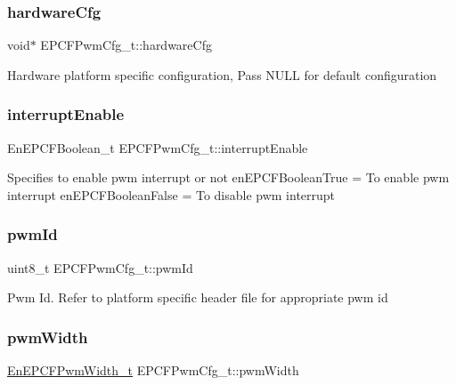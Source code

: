 \subsubsection{\texorpdfstring{hardware\+Cfg}{hardwareCfg}}
{\footnotesize\ttfamily void$\ast$ E\+P\+C\+F\+Pwm\+Cfg\+\_\+t\+::hardware\+Cfg}

Hardware platform specific configuration, Pass N\+U\+LL for default configuration \mbox{\label{structEPCFPwmCfg__t_af2a23b801262e2e4d3e46aab36729f6e}} 
\subsubsection{\texorpdfstring{interrupt\+Enable}{interruptEnable}}
{\footnotesize\ttfamily En\+E\+P\+C\+F\+Boolean\+\_\+t E\+P\+C\+F\+Pwm\+Cfg\+\_\+t\+::interrupt\+Enable}

Specifies to enable pwm interrupt or not en\+E\+P\+C\+F\+Boolean\+True = To enable pwm interrupt en\+E\+P\+C\+F\+Boolean\+False = To disable pwm interrupt \mbox{\label{structEPCFPwmCfg__t_aae8573680c5550161c6b4b057983cc08}} 
\subsubsection{\texorpdfstring{pwm\+Id}{pwmId}}
{\footnotesize\ttfamily uint8\+\_\+t E\+P\+C\+F\+Pwm\+Cfg\+\_\+t\+::pwm\+Id}

Pwm Id. Refer to platform specific header file for appropriate pwm id \mbox{\label{structEPCFPwmCfg__t_a3b231f06daf2114252bafcaaf953fbfb}} 
\subsubsection{\texorpdfstring{pwm\+Width}{pwmWidth}}
{\footnotesize\ttfamily \mbox{\hyperlink{pwm_8h_adc2248862ed98f44dfc603f88fee97be}{En\+E\+P\+C\+F\+Pwm\+Width\+\_\+t}} E\+P\+C\+F\+Pwm\+Cfg\+\_\+t\+::pwm\+Width}

